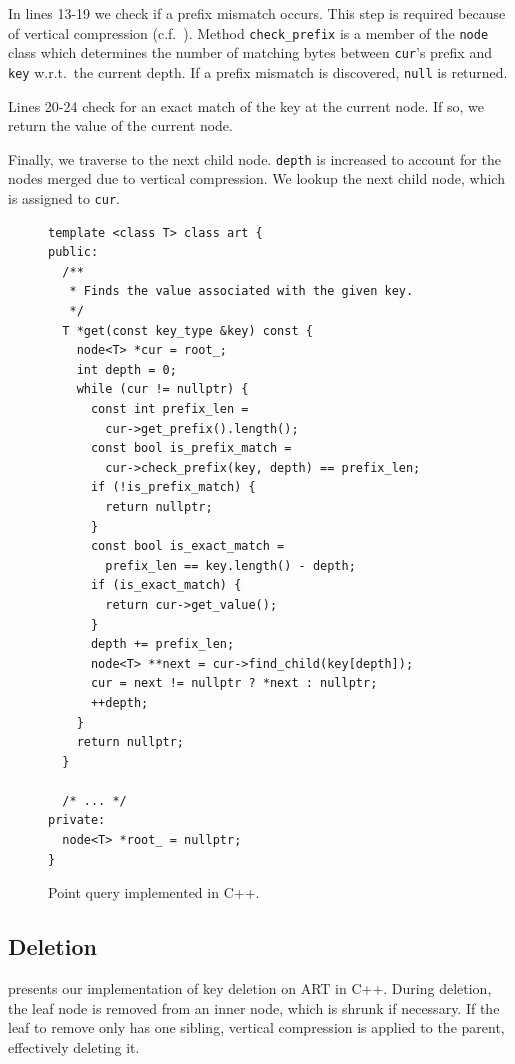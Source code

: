 \documentclass[abstracton,12pt]{scrartcl}
\theoremstyle{definition}
\begin{document}
In lines 13-19 we check if a prefix mismatch occurs. This step is required
because of vertical compression (c.f.\ ).
Method \texttt{check\_prefix} is a member of the \texttt{node} class which
determines the number of matching bytes between \texttt{cur}'s prefix
and \texttt{key} w.r.t.\ the current depth. If a prefix mismatch is discovered,
\texttt{null} is returned.

Lines 20-24 check for an exact match of the key at the current node. If so,
we return the value of the current node.

Finally, we traverse to the next child node. \texttt{depth} is increased to
account for the nodes merged due to vertical compression.
We lookup the next child node, which is assigned to \texttt{cur}.

\begin{figure}[h]
  \begin{verbatim}
template <class T> class art {
public:
  /**
   * Finds the value associated with the given key.
   */
  T *get(const key_type &key) const {
    node<T> *cur = root_;
    int depth = 0;
    while (cur != nullptr) {
      const int prefix_len = 
        cur->get_prefix().length();
      const bool is_prefix_match = 
        cur->check_prefix(key, depth) == prefix_len;
      if (!is_prefix_match) {
        return nullptr;
      }
      const bool is_exact_match = 
        prefix_len == key.length() - depth;
      if (is_exact_match) {
        return cur->get_value();
      }
      depth += prefix_len;
      node<T> **next = cur->find_child(key[depth]);
      cur = next != nullptr ? *next : nullptr;
      ++depth;
    }
    return nullptr;
  }

  /* ... */
private:
  node<T> *root_ = nullptr;
}
  \end{verbatim}
  \caption{Point query implemented in C++.}
  \label{algo:point-query}
\end{figure}

\newpage

\subsection{Deletion}
\label{sec:deletion}

 presents our implementation of key deletion on ART in C++.
During deletion, the leaf node is removed from an inner node, which is shrunk
if necessary. If the leaf to remove only has one sibling, vertical
compression is applied to the parent, effectively deleting it.
\end{document}
